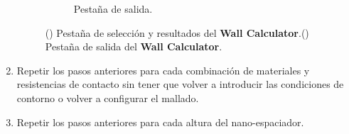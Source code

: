\begin{enumerate}
\begin{figure}[H]
\begin{subfigure}[b]{0.48\textwidth}
			\caption{Pestaña de salida.}
			\label{fig:ventana_wall_calculator_resultados}
		\end{subfigure}
		\caption{() Pestaña de selección y resultados del \textbf{Wall Calculator}.() Pestaña de salida del \textbf{Wall Calculator}.}
		\label{fig:ventana_wall_calculator}
	\end{figure}
	\item Repetir los pasos anteriores para cada combinación de materiales y resistencias de contacto sin tener que volver a introducir las condiciones de contorno o volver a configurar el mallado.
	\item Repetir los pasos anteriores para cada altura del nano-espaciador.
\end{enumerate}